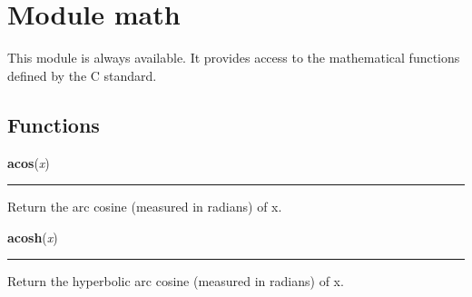%
%
%


\section{Module math}

    \label{math}
This module is always available.  It provides access to the mathematical 
functions defined by the C standard.



  \subsection{Functions}

    \label{math:acos}

    \vspace{0.5ex}

\hspace{.8\funcindent}\begin{boxedminipage}{\funcwidth}

    \raggedright \textbf{acos}(\textit{x})

    \vspace{-1.5ex}

    \rule{\textwidth}{0.5\fboxrule}
\setlength{\parskip}{2ex}
    Return the arc cosine (measured in radians) of x.

\setlength{\parskip}{1ex}
    \end{boxedminipage}

    \label{math:acosh}

    \vspace{0.5ex}

\hspace{.8\funcindent}\begin{boxedminipage}{\funcwidth}

    \raggedright \textbf{acosh}(\textit{x})

    \vspace{-1.5ex}

    \rule{\textwidth}{0.5\fboxrule}
\setlength{\parskip}{2ex}
    Return the hyperbolic arc cosine (measured in radians) of x.

\setlength{\parskip}{1ex}
    \end{boxedminipage}

